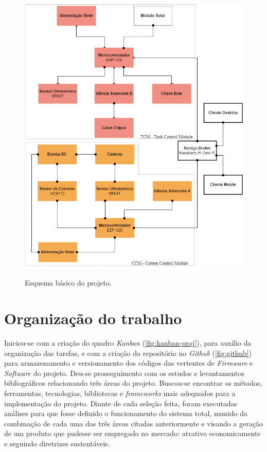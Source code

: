 \begin{figure}[H]
	\centering
	\caption{Esquema básico do projeto.}
	\includegraphics[width=1.05\textwidth]{figuras/esquema_basico_proj_2.png}
	\label{fig:esquema_proj}
\end{figure} 

\section{Organização do trabalho}

Iniciou-se com a criação do quadro \textit{Kanban} (\autoref{fig:kanban-proj}), para auxílio da organização das tarefas, e com a criação do repositório no \textit{Github} (\autoref{fig:github}) para armazenamento e versionamento dos códigos das vertentes de \textit{Firmware} e \textit{Software} do projeto. Deu-se prosseguimento com os estudos e levantamentos bibliográficos relacionando três áreas do projeto. Buscou-se encontrar os métodos,  ferramentas, tecnologias, bibliotecas e \textit{frameworks} mais adequados para a implementação do projeto.  Diante de cada seleção feita, foram executadas análises para que fosse definido o funcionamento do sistema total, munido da combinação de cada uma das três áreas citadas anteriormente e visando a geração de um produto que pudesse ser empregado no mercado: atrativo economicamente e seguindo diretrizes sustentáveis.  

